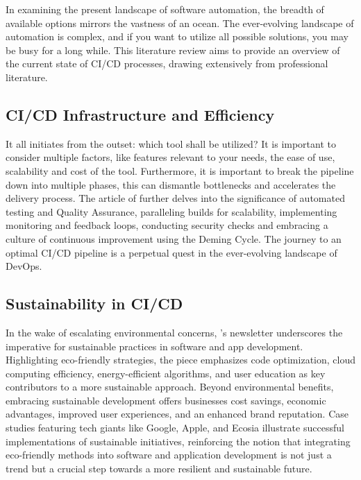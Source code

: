In examining the present landscape of software automation, the breadth of available options mirrors the vastness of an ocean. \autocite{King2019} The ever-evolving landscape of automation is complex, and if you want to utilize all possible solutions, you may be busy for a long while. \autocite{King2019} This literature review aims to provide an overview of the current state of CI/CD processes, drawing extensively from professional literature.

\subsection{CI/CD Infrastructure and Efficiency}

It all initiates from the outset: which tool shall be utilized? It is important to consider multiple factors, like features relevant to your needs, the ease of use, scalability and cost of the tool. Furthermore, it is important to break the pipeline down into multiple phases, this can dismantle bottlenecks and accelerates the delivery process. The article of \textcite{Dahunsi2023} further delves into the significance of automated testing and Quality Assurance, paralleling builds for scalability, implementing monitoring and feedback loops, conducting security checks and embracing a culture of continuous improvement using the Deming Cycle. The journey to an optimal CI/CD pipeline is a perpetual quest in the ever-evolving landscape of DevOps.

\subsection{Sustainability in CI/CD}

In the wake of escalating environmental concerns, \textcite{Corewave2023}'s newsletter underscores the imperative for sustainable practices in software and app development. Highlighting eco-friendly strategies, the piece emphasizes code optimization, cloud computing efficiency, energy-efficient algorithms, and user education as key contributors to a more sustainable approach. Beyond environmental benefits, embracing sustainable development offers businesses cost savings, economic advantages, improved user experiences, and an enhanced brand reputation. Case studies featuring tech giants like Google, Apple, and Ecosia illustrate successful implementations of sustainable initiatives, reinforcing the notion that integrating eco-friendly methods into software and application development is not just a trend but a crucial step towards a more resilient and sustainable future.

